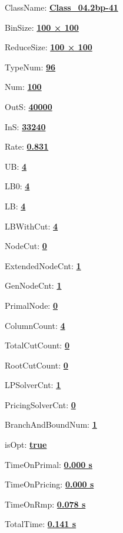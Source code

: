 \documentclass[11pt]{article}
\begin{document}
\pagestyle{empty}


ClassName: \underline{\textbf{Class_04.2bp-41}}
\par
BinSize: \underline{\textbf{100 × 100}}
\par
ReduceSize: \underline{\textbf{100 × 100}}
\par
TypeNum: \underline{\textbf{96}}
\par
Num: \underline{\textbf{100}}
\par
OutS: \underline{\textbf{40000}}
\par
InS: \underline{\textbf{33240}}
\par
Rate: \underline{\textbf{0.831}}
\par
UB: \underline{\textbf{4}}
\par
LB0: \underline{\textbf{4}}
\par
LB: \underline{\textbf{4}}
\par
LBWithCut: \underline{\textbf{4}}
\par
NodeCut: \underline{\textbf{0}}
\par
ExtendedNodeCnt: \underline{\textbf{1}}
\par
GenNodeCnt: \underline{\textbf{1}}
\par
PrimalNode: \underline{\textbf{0}}
\par
ColumnCount: \underline{\textbf{4}}
\par
TotalCutCount: \underline{\textbf{0}}
\par
RootCutCount: \underline{\textbf{0}}
\par
LPSolverCnt: \underline{\textbf{1}}
\par
PricingSolverCnt: \underline{\textbf{0}}
\par
BranchAndBoundNum: \underline{\textbf{1}}
\par
isOpt: \underline{\textbf{true}}
\par
TimeOnPrimal: \underline{\textbf{0.000 s}}
\par
TimeOnPricing: \underline{\textbf{0.000 s}}
\par
TimeOnRmp: \underline{\textbf{0.078 s}}
\par
TotalTime: \underline{\textbf{0.141 s}}
\par
\newpage
\end{document}

